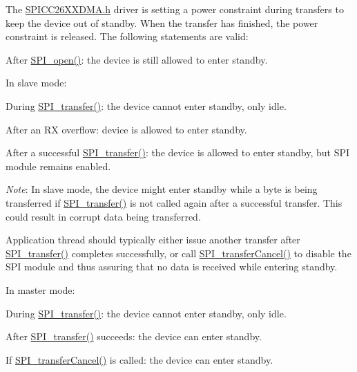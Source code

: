 The \hyperlink{_s_p_i_c_c26_x_x_d_m_a_8h}{S\+P\+I\+C\+C26\+X\+X\+D\+M\+A.\+h} driver is setting a power constraint during transfers to keep the device out of standby. When the transfer has finished, the power constraint is released. The following statements are valid\+:
\begin{DoxyItemize}
\item After \hyperlink{_s_p_i_8h_a62cfe494cb1df47cd602e8747e894fd1}{S\+P\+I\+\_\+open()}\+: the device is still allowed to enter standby.
\item In slave mode\+:
\begin{DoxyItemize}
\item During \hyperlink{_s_p_i_8h_a989e17f96b54fcc3dc2cac5f8ac6bdb2}{S\+P\+I\+\_\+transfer()}\+: the device cannot enter standby, only idle.
\item After an R\+X overflow\+: device is allowed to enter standby.
\item After a successful \hyperlink{_s_p_i_8h_a989e17f96b54fcc3dc2cac5f8ac6bdb2}{S\+P\+I\+\_\+transfer()}\+: the device is allowed to enter standby, but S\+P\+I module remains enabled.
\begin{DoxyItemize}
\item {\itshape Note}\+: In slave mode, the device might enter standby while a byte is being transferred if \hyperlink{_s_p_i_8h_a989e17f96b54fcc3dc2cac5f8ac6bdb2}{S\+P\+I\+\_\+transfer()} is not called again after a successful transfer. This could result in corrupt data being transferred.
\end{DoxyItemize}
\item Application thread should typically either issue another transfer after \hyperlink{_s_p_i_8h_a989e17f96b54fcc3dc2cac5f8ac6bdb2}{S\+P\+I\+\_\+transfer()} completes successfully, or call \hyperlink{_s_p_i_8h_a6819f7761fc3505c4f885653ff8121f0}{S\+P\+I\+\_\+transfer\+Cancel()} to disable the S\+P\+I module and thus assuring that no data is received while entering standby.
\end{DoxyItemize}
\item In master mode\+:
\begin{DoxyItemize}
\item During \hyperlink{_s_p_i_8h_a989e17f96b54fcc3dc2cac5f8ac6bdb2}{S\+P\+I\+\_\+transfer()}\+: the device cannot enter standby, only idle.
\item After \hyperlink{_s_p_i_8h_a989e17f96b54fcc3dc2cac5f8ac6bdb2}{S\+P\+I\+\_\+transfer()} succeeds\+: the device can enter standby.
\item If \hyperlink{_s_p_i_8h_a6819f7761fc3505c4f885653ff8121f0}{S\+P\+I\+\_\+transfer\+Cancel()} is called\+: the device can enter standby.
\end{DoxyItemize}
\end{DoxyItemize}


